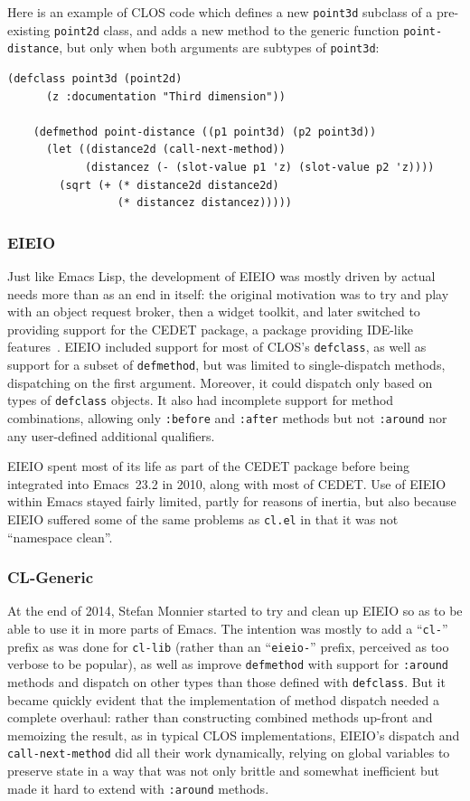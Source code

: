 \documentclass[format=acmsmall,screen]{acmart}
\newcommand \Elisp {Emacs Lisp}
\begin{document}
Here is an example of CLOS code which defines a new \texttt{point3d} subclass
of a pre-existing \texttt{point2d} class, and adds a new method to the
generic function \texttt{point-distance}, but only when both
arguments are subtypes of \texttt{point3d}:
\begin{Verbatim}[samepage=true]
    (defclass point3d (point2d)
      (z :documentation "Third dimension"))

    (defmethod point-distance ((p1 point3d) (p2 point3d))
      (let ((distance2d (call-next-method))
            (distancez (- (slot-value p1 'z) (slot-value p2 'z))))
        (sqrt (+ (* distance2d distance2d)
                 (* distancez distancez)))))
\end{Verbatim}

\subsubsection{EIEIO}

Just like \Elisp{}, the development of EIEIO was mostly
driven by actual needs more than as an end in itself: the original
motivation was to try and play with an object request broker, then a widget
toolkit, and later switched to providing support for the CEDET
package, a package providing IDE-like features~\cite{Ludlam18}.
EIEIO included support for most of CLOS's \texttt{defclass}, as well as support
for a subset of \texttt{defmethod}, but was limited to
single-dispatch methods, dispatching on the first argument.  Moreover, it could
dispatch only based on types of \texttt{defclass} objects.  It also had
incomplete support for method combinations, allowing only \texttt{:before}
and \texttt{:after} methods but not \texttt{:around} nor any user-defined
additional qualifiers.

EIEIO spent most of its life as part of the CEDET package
before being integrated into Emacs~23.2 in
2010, along with most of CEDET.  Use of EIEIO within Emacs stayed fairly
limited, partly for reasons of inertia, but also because EIEIO suffered some
of the same problems as \texttt{cl.el} in that it was not
``namespace clean''.

\subsubsection{CL-Generic}

At the end of 2014, Stefan Monnier started to try and clean up EIEIO so as
to be able to use it in more parts of Emacs.  The intention was mostly to
add a ``\texttt{cl-}'' prefix as was done for \texttt{cl-lib} (rather than
an ``\texttt{eieio-}'' prefix, perceived as too verbose to be
popular), as well as improve \texttt{defmethod} with
support for \texttt{:around} methods and dispatch on other types than those
defined with \texttt{defclass}.
But it became quickly evident that the implementation of method dispatch
needed a complete overhaul: rather than constructing combined methods
up-front and memoizing the result, as in typical CLOS implementations,
EIEIO's dispatch and \texttt{call-next-method} did all their work
dynamically, relying on global variables to preserve state in
a way that was not only brittle and somewhat inefficient but made it
hard to extend with \texttt{:around} methods.
\end{document}
